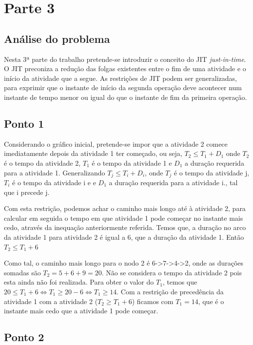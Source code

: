\chapter{Parte 3}
\label{cap:p3}

\section{Análise do problema}
Nesta 3ª parte do trabalho pretende-se introduzir o conceito do JIT
\emph{just-in-time}. O JIT preconiza a redução das folgas existentes entre
o fim de uma atividade e o início da atividade que a segue. 
As restrições de JIT podem ser generalizadas, para exprimir que o instante de
início da segunda operação deve acontecer num instante de tempo menor ou igual
do que o instante de fim da primeira operação.



\section{Ponto 1}

Considerando o gráfico inicial, pretende-se impor que a atividade 2 comece
imediatamente depois da atividade 1 ter começado, ou seja, $T_2 \le T_1 + D_1$
onde $T_2$ é o tempo da atividade 2, $T_1$ é o tempo da atividade 1 e $D_1$
a duração requerida para a atividade 1. Generalizando $T_j \le T_i + D_i$, onde
$T_j$ é o tempo da atividade j, $T_i$ é o tempo da atividade i e  e $D_1$
a duração requerida para a atividade i., tal que i precede j.

Com esta restrição, podemos achar o caminho mais longo até à atividade 2, para
calcular em seguida o tempo em que atividade 1 pode começar no instante mais
cedo, através da inequação anteriormente referida. Temos que, a duração no arco
da atividade 1 para atividade 2 é igual a 6, que a duração da atividade 1. Então
$T_2 \le T_1 + 6$

Como tal, o caminho mais longo para o nodo 2 é 6->7->4->2, onde as durações
somadas são $T_2 = 5 + 6 + 9 = 20$. Não se considera o tempo da atividade 2 pois esta
ainda não foi realizada. Para obter o valor do $T_1$, temos que $20 \le T_1
+ 6 \Leftrightarrow T_1 \ge 20 - 6 \Leftrightarrow T_1 \ge 14$. Com a restrição
de precedência da atividade 1 com a atividade 2 ($T_2 \ge T_1 + 6$) ficamos com 
$T_1 = 14$, que é o instante mais cedo que a atividade 1 pode começar.

\section{Ponto 2}

